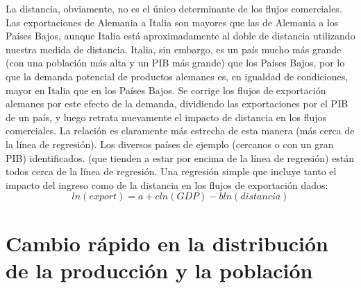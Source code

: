 \begin{multicols}{2}
   La distancia, obviamente, no es el único determinante de los flujos comerciales. Las exportaciones de Alemania a Italia son mayores que las de Alemania a los Países Bajos, aunque Italia está aproximadamente al doble de distancia utilizando nuestra medida de distancia. Italia, sin embargo, es un país mucho más grande (con una población más alta y un PIB más grande) que los Países Bajos, por lo que la demanda potencial de productos alemanes es, en igualdad de condiciones, mayor en Italia que en los Países Bajos.  Se corrige los flujos de exportación alemanes por este efecto de la demanda, dividiendo las exportaciones por el PIB de un país, y luego retrata nuevamente el impacto de distancia en los flujos comerciales. La relación es claramente más estrecha de esta manera (más cerca de la línea de regresión). Los diversos países de ejemplo (cercanos o con un gran PIB) identificados. (que tienden a estar por encima de la línea de regresión) están todos cerca de la línea de regresión. Una regresión simple que incluye tanto el impacto del ingreso como de la distancia en los flujos de exportación dados:
   $$ln(export) = a + c ln(GDP) - b ln(distancia)$$

\section{Cambio rápido en la distribución de la producción y la población}

\end{multicols}
